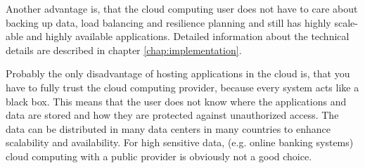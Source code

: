 Another advantage is, that the cloud computing user does not have to care about backing up data, load balancing and resilience planning and still has highly scale-able and highly available applications. Detailed information about the technical details are described in chapter \ref{chap:implementation}. 

Probably the only disadvantage of hosting applications in the cloud  is, that you have to fully trust the cloud computing provider, because every system acts like a black box. This means that the user does not know where the applications and data are stored and how they are protected against unauthorized access. The data can be distributed in many data centers in many countries to enhance scalability and availability. For high sensitive data, (e.g. online banking systems) cloud computing with a public provider is obviously not a good choice.